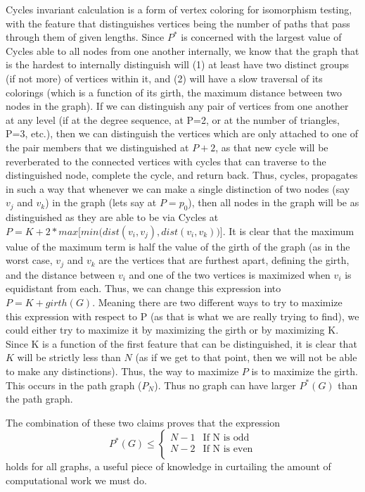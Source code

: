 Cycles invariant calculation is a form of vertex coloring for isomorphism testing, with the feature that distinguishes vertices being the number of paths that pass through them of given lengths.
Since $P^*$ is concerned with the largest value of Cycles able to all nodes from one another internally, we know that the graph that is the hardest to internally distinguish will (1) at least have two distinct groups (if not more) of vertices within it, and (2) will have a slow traversal of its colorings (which is a function of its girth, the maximum distance between two nodes in the graph).
If we can distinguish any pair of vertices from one another at any level (if at the degree sequence, at P=2, or at the number of triangles, P=3, etc.), then we can distinguish the vertices which are only attached to one of the pair members that we distinguished at $P+2$, as that new cycle will be reverberated to the connected vertices with cycles that can traverse to the distinguished node, complete the cycle, and return back.
Thus, cycles, propagates in such a way that whenever we can make a single distinction of two nodes (say $v_j$ and $v_k$) in the graph (lets say at $P=p_0$), then all nodes in the graph will be as distinguished as they are able to be via Cycles at $P=K+2*max\big[min\big(dist(v_i,v_j), dist(v_i,v_k)\big)\big]$.
It is clear that the maximum value of the maximum term is half the value of the girth of the graph (as in the worst case, $v_j$ and $v_k$ are the vertices that are furthest apart, defining the girth, and the distance between $v_i$ and one of the two vertices is maximized when $v_i$ is equidistant from each. 
Thus, we can change this expression into $P=K+girth(G)$.
Meaning there are two different ways to try to maximize this expression with respect to P (as that is what we are really trying to find), we could either try to maximize it by maximizing the girth or by maximizing K.
Since K is a function of the first feature that can be distinguished, it is clear that $K$ will be strictly less than $N$ (as if we get to that point, then we will not be able to make any distinctions).
Thus, the way to maximize $P$ is to maximize the girth.
This occurs in the path graph ($P_N$).
Thus no graph can have larger $P^*(G)$ than the path graph.

The combination of these two claims proves that the expression 
\[ P^*(G) \leq \begin{cases} 
      N-1 & \text{If N is odd} \\
      N-2 & \text{If N is even} \\
   \end{cases}
\]
holds for all graphs, a useful piece of knowledge in curtailing the amount of computational work we must do. 

